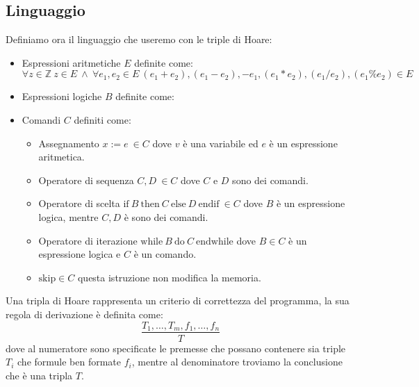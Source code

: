 \subsection{Linguaggio}
Definiamo ora il linguaggio che useremo con le triple di Hoare:
\begin{itemize}
    \item Espressioni aritmetiche $E$ definite come:
    \begin{equation}
        \forall z \in \mathbb{Z} \ z \in E \ \land \ \forall e_1, e_2 \in E \ (e_1 + e_2), (e_1 - e_2), -e_1, (e_1 \ast e_2), (e_1 / e_2), (e_1 \% e_2) \in E
    \end{equation}
    \item Espressioni logiche $B$ definite come:
    \item Comandi $C$ definiti come:
    \begin{itemize}
        \item Assegnamento $x := e \ \in C$ dove $v$ è una variabile ed $e$ è un espressione aritmetica.
        \item Operatore di sequenza $C, D \ \in C $ dove $C$ e $D$ sono dei comandi.
        \item Operatore di scelta $\text{if} \ B \ \text{then} \ C \ \text{else} \ D \ \text{endif} \ \in C$ dove $B$ è un espressione logica, mentre $C, D$ è sono dei comandi.
        \item Operatore di iterazione $\text{while} \ B \ \text{do} \ C \ \text{endwhile}$ dove $B \in C$ è un espressione logica e $C$ è un comando.
        \item $\text{skip} \in C$ questa istruzione non modifica la memoria.
    \end{itemize}
\end{itemize}

Una tripla di Hoare rappresenta un criterio di correttezza del programma, la sua regola di derivazione è definita come:
\begin{equation}
    \frac{T_1, \dots, T_m, f_1, \dots, f_n}{T}
\end{equation}
dove al numeratore sono specificate le premesse che possano contenere sia triple $T_i$ che formule ben formate $f_i$, mentre al denominatore troviamo la conclusione che è una tripla $T$.

